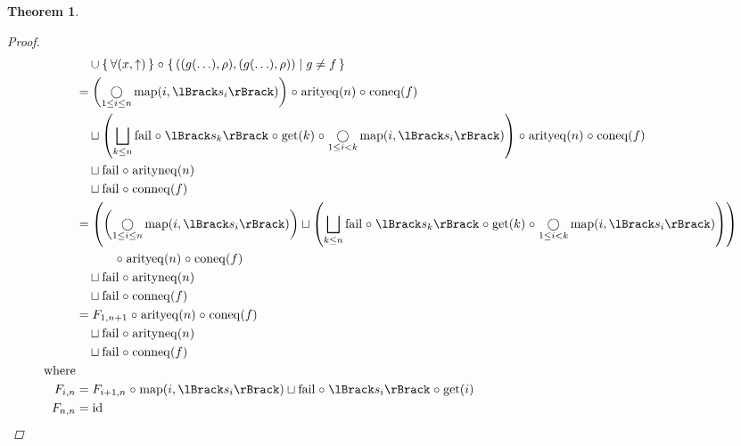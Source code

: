 \documentclass{article}
\newtheorem{theorem}{Theorem}
\newcommand{\fail}{\ensuremath \text{$\uparrow$}}
\newcommand{\sem}[1]{\ensuremath \lBrack #1 \rBrack}
\newcommand{\setbuild}[2]{\ensuremath \{\, #1 \mid #2 \,\}}
\newcommand{\setbuildc}[1]{\ensuremath \{\, #1 \,\}}
\newcommand{\id}{\ensuremath \operatorname{id}}
\newcommand{\lfail}{\ensuremath \operatorname{fail}}
\newcommand{\get}{\ensuremath \operatorname{get}}
\newcommand{\map}{\ensuremath \operatorname{map}}
\newcommand{\arityeq}{\ensuremath \operatorname{arityeq}}
\newcommand{\arityneq}{\ensuremath \operatorname{arityneq}}
\newcommand{\coneq}{\ensuremath \operatorname{coneq}}
\newcommand{\conneq}{\ensuremath \operatorname{conneq}}
\newcommand{\comp}{\ensuremath \mathrel{\circ}}
\newcommand{\Comp}{\ensuremath \mathop{\bigcirc}}
\begin{document}
\begin{theorem}
\begin{proof}
\begin{align*}
    &\quad \cup \setbuildc{ \forall (x,\fail) } \comp \setbuild{((g(\ldots),\rho),(g(\ldots),\rho))}{ g \neq f } \\
    &= \left( \Comp_{1\leq i \leq n} \map(i,\sem{s_i}) \right) \comp \arityeq(n) \comp \coneq(f) \\
    &\quad \sqcup \left( \bigsqcup_{k \leq n} \lfail \comp \sem{s_k} \comp \get(k) \comp \mathop{\bigcirc}_{1 \leq i < k} \map(i,\sem{s_i}) \right) \comp \arityeq(n) \comp \coneq(f) \\
    &\quad \sqcup \lfail \comp \arityneq(n) \\
    &\quad \sqcup \lfail \comp \conneq(f) \\
    &= \left( \left( \Comp_{1\leq i \leq n} \map(i,\sem{s_i}) \right) \sqcup \left( \bigsqcup_{k \leq n} \lfail \comp \sem{s_k} \comp \get(k) \comp \mathop{\bigcirc}_{1 \leq i < k} \map(i,\sem{s_i}) \right) \right) \\
    &\qquad\quad \comp \arityeq(n) \comp \coneq(f) \\
    &\quad \sqcup \lfail \comp \arityneq(n) \\
    &\quad \sqcup \lfail \comp \conneq(f) \\
    &= F_{1,n+1} \comp \arityeq(n) \comp \coneq(f) \\
    &\quad \sqcup \lfail \comp \arityneq(n) \\
    &\quad \sqcup \lfail \comp \conneq(f) \\
\text{where}& \\
  F_{i,n} &= F_{i+1,n} \comp \map(i,\sem{s_i}) \sqcup \lfail \comp \sem{s_i} \comp \get(i) \\
  F_{n,n} &= \id
\end{align*}


\end{proof}
\end{theorem}
\end{document}
